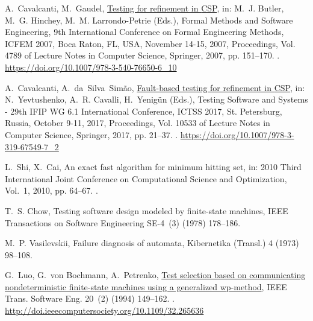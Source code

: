 \documentclass[3p,times]{elsarticle}
\begin{document}
\begin{thebibliography}{10}
A.~Cavalcanti, M.~Gaudel,
  \href{https://doi.org/10.1007/978-3-540-76650-6\_10}{Testing for refinement
  in {CSP}}, in: M.~J. Butler, M.~G. Hinchey, M.~M. Larrondo{-}Petrie (Eds.),
  Formal Methods and Software Engineering, 9th International Conference on
  Formal Engineering Methods, {ICFEM} 2007, Boca Raton, FL, USA, November
  14-15, 2007, Proceedings, Vol. 4789 of Lecture Notes in Computer Science,
  Springer, 2007, pp. 151--170.
\newblock \href {http://dx.doi.org/10.1007/978-3-540-76650-6\_10}
  {}.
\newline\urlprefix\url{https://doi.org/10.1007/978-3-540-76650-6\_10}

A.~Cavalcanti, A.~da~Silva~Sim{\~{a}}o,
  \href{https://doi.org/10.1007/978-3-319-67549-7\_2}{Fault-based testing for
  refinement in {CSP}}, in: N.~Yevtushenko, A.~R. Cavalli, H.~Yenig{\"{u}}n
  (Eds.), Testing Software and Systems - 29th {IFIP} {WG} 6.1 International
  Conference, {ICTSS} 2017, St. Petersburg, Russia, October 9-11, 2017,
  Proceedings, Vol. 10533 of Lecture Notes in Computer Science, Springer, 2017,
  pp. 21--37.
\newblock \href {http://dx.doi.org/10.1007/978-3-319-67549-7\_2}
  {}.
\newline\urlprefix\url{https://doi.org/10.1007/978-3-319-67549-7\_2}

L.~Shi, X.~Cai, An exact fast algorithm for minimum hitting set, in: 2010 Third
  International Joint Conference on Computational Science and Optimization,
  Vol.~1, 2010, pp. 64--67.
\newblock \href {http://dx.doi.org/10.1109/CSO.2010.240}
  {}.

T.~S. Chow, Testing software design modeled by finite-state machines, IEEE
  Transactions on Software Engineering SE-4~(3) (1978) 178--186.

M.~P. Vasilevskii, Failure diagnosis of automata, Kibernetika (Transl.) 4
  (1973) 98--108.

G.~Luo, G.~von Bochmann, A.~Petrenko,
  \href{http://doi.ieeecomputersociety.org/10.1109/32.265636}{Test selection
  based on communicating nondeterministic finite-state machines using a
  generalized wp-method}, {IEEE} Trans. Software Eng. 20~(2) (1994) 149--162.
\newblock \href {http://dx.doi.org/10.1109/32.265636}
  {}.
\newline\urlprefix\url{http://doi.ieeecomputersociety.org/10.1109/32.265636}


\end{thebibliography}
\end{document}
